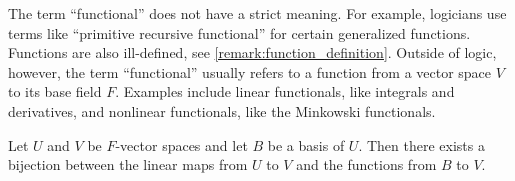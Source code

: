 \begin{remark}\label{remark:functional}
  The term \enquote{functional} does not have a strict meaning. For example, logicians use terms like \enquote{primitive recursive functional} for certain generalized functions. Functions are also ill-defined, see \cref{remark:function_definition}. Outside of logic, however, the term \enquote{functional} usually refers to a function from a vector space \( V \) to its base field \( F \). Examples include linear functionals, like integrals and derivatives, and nonlinear functionals, like the Minkowski functionals.
\end{remark}

\begin{proposition}\label{thm:linear_operator_iff_function_on_basis}
  Let \( U \) and \( V \) be \( F \)-vector spaces and let \( B \) be a basis of \( U \). Then there exists a bijection between the linear maps from \( U \) to \( V \) and the functions from \( B \) to \( V \).
\end{proposition}
